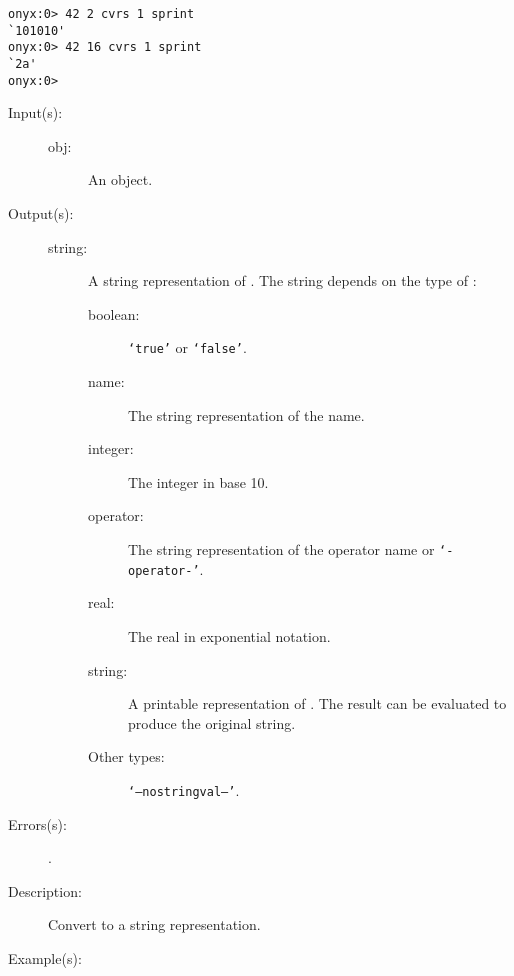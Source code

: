 \begin{description}
\begin{description}
\begin{verbatim}
onyx:0> 42 2 cvrs 1 sprint
`101010'
onyx:0> 42 16 cvrs 1 sprint
`2a'
onyx:0>
		\end{verbatim}
	\end{description}
\label{systemdict:cvs}
\item[{\onyxop{obj}{cvs}{string}}: ]
	\begin{description}\item[]
	\item[Input(s): ]
		\begin{description}\item[]
		\item[obj: ]
			An object.
		\end{description}
	\item[Output(s): ]
		\begin{description}\item[]
		\item[string: ]
			A string representation of .  The string
			depends on the type of :
			\begin{description}
			\item[boolean: ] {\tt `true'} or  {\tt `false'}.
			\item[name: ] The string representation of the name.
			\item[integer: ] The integer in base 10.
			\item[operator: ] The string representation of the
			operator name or {\tt `-operator-'}.
			\item[real: ] The real in exponential notation.
			\item[string: ] A printable representation of
			.  The result can be evaluated to produce
			the original string.
			\item[Other types: ] {\tt `--nostringval--'}.
			\end{description}
		\end{description}
	\item[Errors(s): ]
		\begin{description}\item[]
		\item[.]
		\end{description}
	\item[Description: ]
		Convert  to a string representation.
	\item[Example(s): ]\begin{verbatim}


\end{verbatim}
\end{description}
\end{description}

